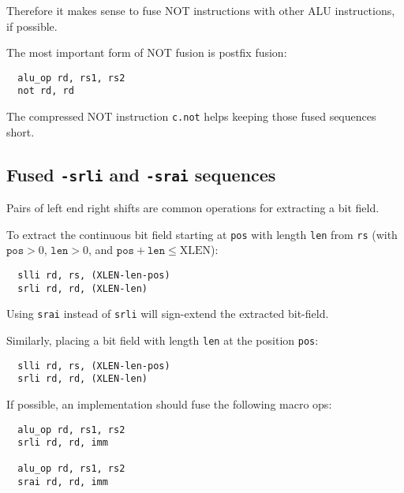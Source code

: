 Therefore it makes sense to fuse NOT instructions with other ALU instructions, if possible.

The most important form of NOT fusion is postfix fusion:

\begin{minipage}{\linewidth}
\begin{verbatim}
  alu_op rd, rs1, rs2
  not rd, rd
\end{verbatim}
\end{minipage}

The compressed NOT instruction {\tt c.not} helps keeping those fused sequences short.


\subsection{Fused {\tt *-srli} and {\tt *-srai} sequences}

Pairs of left end right shifts are common operations for extracting a bit field.

To extract the continuous bit field starting at {\tt pos} with length {\tt len}
from {\tt rs} (with $\texttt{pos}>0$, $\texttt{len}>0$, and
$\texttt{pos}+\texttt{len}\le\textrm{XLEN}$):

\begin{minipage}{\linewidth}
\begin{verbatim}
  slli rd, rs, (XLEN-len-pos)
  srli rd, rd, (XLEN-len)
\end{verbatim}
\end{minipage}

Using \texttt{srai} instead of \texttt{srli} will sign-extend the extracted bit-field.

Similarly, placing a bit field with length {\tt len} at the position {\tt pos}:

\begin{minipage}{\linewidth}
\begin{verbatim}
  slli rd, rs, (XLEN-len-pos)
  srli rd, rd, (XLEN-len)
\end{verbatim}
\end{minipage}

If possible, an implementation should fuse the following macro ops:

\begin{minipage}{\linewidth}
\begin{verbatim}
  alu_op rd, rs1, rs2
  srli rd, rd, imm

  alu_op rd, rs1, rs2
  srai rd, rd, imm
\end{verbatim}
\end{minipage}

